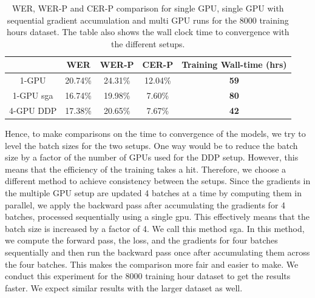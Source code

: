 \begin{table}[ht]
\centering
\begin{tabular}{c | c c c | c }
\hline
     & WER & WER-P & CER-P & Training Wall-time (hrs)\\
 \hline
  1-GPU & 20.74\% & 24.31\% & 12.04\% & \textbf{59} \\
  1-GPU \acrshort{sga} & 16.74\% & 19.98\% & 7.60\% & \textbf{80} \\
  4-GPU DDP & 17.38\% & 20.65\% & 7.67\% & \textbf{42} \\
 \hline
\end{tabular}
\caption{\label{table:wer_ddp_grad} WER, WER-P and CER-P comparison for single GPU, single GPU with sequential gradient accumulation and multi GPU runs for the 8000 training hours dataset. The table also shows the wall clock time to convergence with the different setups.}
\end{table}

Hence, to make comparisons on the time to convergence of the models, we try to level the batch sizes for the two setups. One way would be to reduce the batch size by a factor of the number of GPUs used for the DDP setup. However, this means that the efficiency of the training takes a hit. Therefore, we choose a different method to achieve consistency between the setups. Since the gradients in the multiple GPU setup are updated 4 batches at a time by computing them in parallel, we apply the backward pass after accumulating the gradients for 4 batches, processed sequentially using a single \acrshort{gpu}. This effectively means that the batch size is increased by a factor of 4. We call this method \acrfull{sga}. In this method, we compute the forward pass, the loss, and the gradients for four batches sequentially and then run the backward pass once after accumulating them across the four batches. This makes the comparison more fair and easier to make. We conduct this experiment for the 8000 training hour dataset to get the results faster. We expect similar results with the larger dataset as well. 

